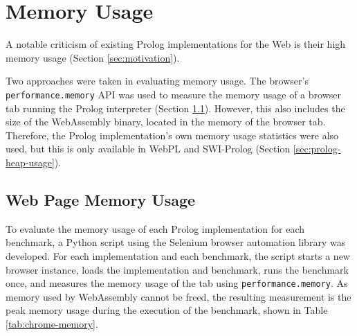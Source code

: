 \section{Memory Usage}

\label{sec:memory-usage}

A notable criticism of existing Prolog implementations for the Web is their high memory usage (Section \ref{sec:motivation}).

Two approaches were taken in evaluating memory usage. The browser's \texttt{performance.memory} API was used to measure the memory usage of a browser tab running the Prolog interpreter (Section \ref{sec:web-page-memory-usage}). However, this also includes the size of the WebAssembly binary, located in the memory of the browser tab. Therefore, the Prolog implementation's own memory usage statistics were also used, but this is only available in WebPL and SWI-Prolog (Section \ref{sec:prolog-heap-usage}).

\subsection{Web Page Memory Usage}

\label{sec:web-page-memory-usage}

To evaluate the memory usage of each Prolog implementation for each benchmark, a Python script using the Selenium browser automation library was developed. For each implementation and each benchmark, the script starts a new browser instance, loads the implementation and benchmark, runs the benchmark once, and measures the memory usage of the tab using \texttt{performance.memory}. As memory used by WebAssembly cannot be freed, the resulting measurement is the peak memory usage during the execution of the benchmark, shown in Table \ref{tab:chrome-memory}.

